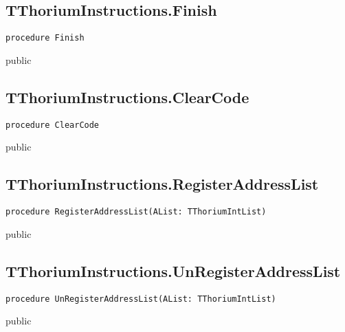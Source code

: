 \subsection{TThoriumInstructions.Finish}
\label{thoriumcore:thorium:tthoriuminstructions:finish}
\begin{FPCList}
\Synopsis
\Declaration 

\begin{verbatim}
procedure Finish
\end{verbatim}
\Visibility
public
\Description
\Errors
\end{FPCList}
\subsection{TThoriumInstructions.ClearCode}
\label{thoriumcore:thorium:tthoriuminstructions:clearcode}
\begin{FPCList}
\Synopsis
\Declaration 

\begin{verbatim}
procedure ClearCode
\end{verbatim}
\Visibility
public
\Description
\Errors
\end{FPCList}
\subsection{TThoriumInstructions.RegisterAddressList}
\label{thoriumcore:thorium:tthoriuminstructions:registeraddresslist}
\begin{FPCList}
\Synopsis
\Declaration 

\begin{verbatim}
procedure RegisterAddressList(AList: TThoriumIntList)
\end{verbatim}
\Visibility
public
\Description
\Errors
\end{FPCList}
\subsection{TThoriumInstructions.UnRegisterAddressList}
\label{thoriumcore:thorium:tthoriuminstructions:unregisteraddresslist}
\begin{FPCList}
\Synopsis
\Declaration 

\begin{verbatim}
procedure UnRegisterAddressList(AList: TThoriumIntList)
\end{verbatim}
\Visibility
public
\Description
\Errors
\end{FPCList}
